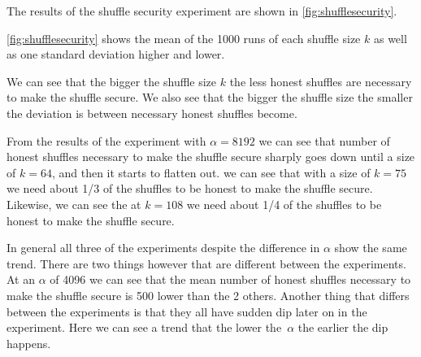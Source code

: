 The results of the shuffle security experiment are shown in \autoref{fig:shufflesecurity}.

\autoref{fig:shufflesecurity} shows the mean of the 1000 runs of each shuffle size $k$ as well as one standard deviation higher and lower.

We can see that the bigger the shuffle size $k$ the less honest shuffles are necessary to make the shuffle secure.
We also see that the bigger the shuffle size the smaller the deviation is between necessary honest shuffles become.

From the results of the experiment with $\alpha=8192$ we can see that number of honest shuffles necessary to make the shuffle secure sharply goes down until a size of $k=64$, and then it starts to flatten out.
we can see that with a size of $k=75$ we need about 1/3 of the shuffles to be honest to make the shuffle secure.
Likewise, we can see the at $k=108$ we need about 1/4 of the shuffles to be honest to make the shuffle secure.

In general all three of the experiments despite the difference in $\alpha$ show the same trend.
There are two things however that are different between the experiments.
At an $\alpha$ of 4096 we can see that the mean number of honest shuffles necessary to make the shuffle secure is 500 lower than the 2 others.
Another thing that differs between the experiments is that they all have sudden dip later on in the experiment.
Here we can see a trend that the lower the~$\alpha$ the earlier the dip happens.
